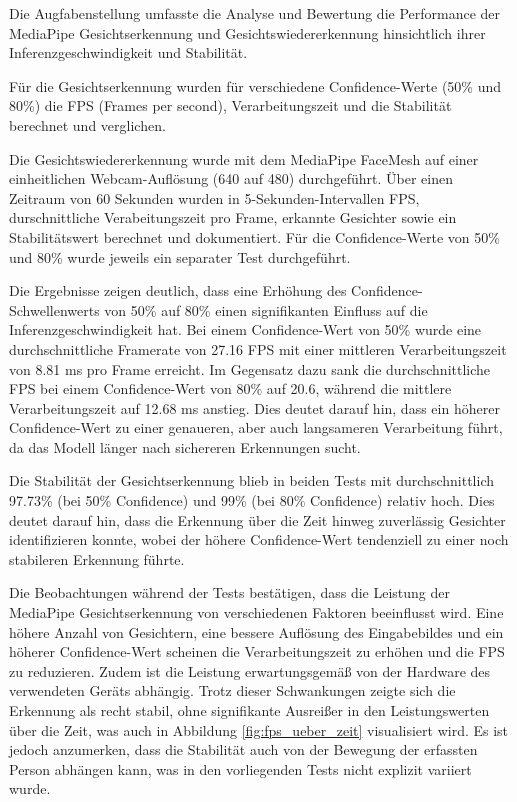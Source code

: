 Die Augfabenstellung umfasste die Analyse und Bewertung die Performance der MediaPipe Gesichtserkennung und Gesichtswiedererkennung hinsichtlich ihrer Inferenzgeschwindigkeit und Stabilität.

Für die Gesichtserkennung wurden für verschiedene Confidence-Werte (50\% und 80\%) die FPS (Frames per second), Verarbeitungszeit und die Stabilität berechnet und verglichen.

Die Gesichtswiedererkennung wurde mit dem MediaPipe FaceMesh auf einer einheitlichen Webcam-Auflösung (640 auf 480) durchgeführt. Über einen Zeitraum von 60 Sekunden wurden in 5-Sekunden-Intervallen FPS, durschnittliche Verabeitungszeit pro Frame, erkannte Gesichter sowie ein Stabilitätswert berechnet und dokumentiert.
Für die Confidence-Werte von 50\% und 80\% wurde jeweils ein separater Test durchgeführt.

Die Ergebnisse zeigen deutlich, dass eine Erhöhung des Confidence-Schwellenwerts von 50\% auf 80\% einen signifikanten Einfluss auf die Inferenzgeschwindigkeit hat. Bei einem Confidence-Wert von 50\% wurde eine durchschnittliche Framerate von 27.16 FPS mit einer mittleren Verarbeitungszeit von 8.81 ms pro Frame erreicht. Im Gegensatz dazu sank die durchschnittliche FPS bei einem Confidence-Wert von 80\% auf 20.6, während die mittlere Verarbeitungszeit auf 12.68 ms anstieg. Dies deutet darauf hin, dass ein höherer Confidence-Wert zu einer genaueren, aber auch langsameren Verarbeitung führt, da das Modell länger nach sichereren Erkennungen sucht.

Die Stabilität der Gesichtserkennung blieb in beiden Tests mit durchschnittlich 97.73\% (bei 50\% Confidence) und 99\% (bei 80\% Confidence) relativ hoch. Dies deutet darauf hin, dass die Erkennung über die Zeit hinweg zuverlässig Gesichter identifizieren konnte, wobei der höhere Confidence-Wert tendenziell zu einer noch stabileren Erkennung führte.

Die Beobachtungen während der Tests bestätigen, dass die Leistung der MediaPipe Gesichtserkennung von verschiedenen Faktoren beeinflusst wird. Eine höhere Anzahl von Gesichtern, eine bessere Auflösung des Eingabebildes und ein höherer Confidence-Wert scheinen die Verarbeitungszeit zu erhöhen und die FPS zu reduzieren. Zudem ist die Leistung erwartungsgemäß von der Hardware des verwendeten Geräts abhängig. Trotz dieser Schwankungen zeigte sich die Erkennung als recht stabil, ohne signifikante Ausreißer in den Leistungswerten über die Zeit, was auch in Abbildung \ref{fig:fps_ueber_zeit} visualisiert wird. Es ist jedoch anzumerken, dass die Stabilität auch von der Bewegung der erfassten Person abhängen kann, was in den vorliegenden Tests nicht explizit variiert wurde.

